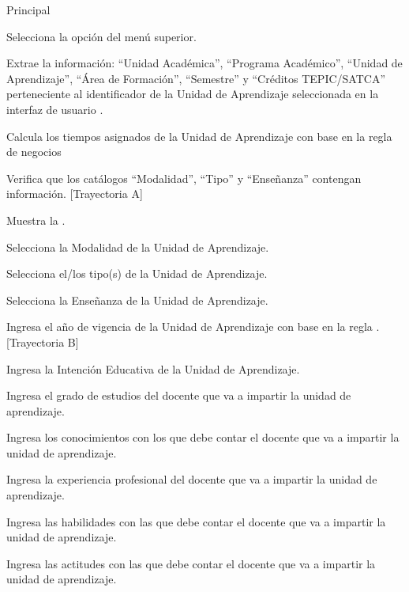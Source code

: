 \begin{UCtrayectoria}{Principal}

	\UCpaso[\UCactor] Selecciona la opción  del menú superior.
	
	\UCpaso Extrae la información: ``Unidad Académica'', ``Programa Académico'', ``Unidad de Aprendizaje'', ``Área de Formación'', ``Semestre'' y ``Créditos TEPIC/SATCA'' perteneciente al identificador de la Unidad de Aprendizaje seleccionada en la interfaz de usuario .
	
	\UCpaso Calcula los tiempos asignados de la Unidad de Aprendizaje con base en la regla de negocios 
	
	\UCpaso Verifica que los catálogos ``Modalidad'', ``Tipo'' y ``Enseñanza'' contengan información. [Trayectoria A]
	
	\UCpaso Muestra la . 
	
	\UCpaso[\UCactor] Selecciona la Modalidad de la Unidad de Aprendizaje. %
	
	\UCpaso[\UCactor] Selecciona el/los tipo(s) de la Unidad de Aprendizaje. %
	
	\UCpaso[\UCactor] Selecciona la Enseñanza de la Unidad de Aprendizaje. %
	
	\UCpaso[\UCactor] Ingresa el año de vigencia de la Unidad de Aprendizaje con base en la regla . [Trayectoria B]
	
	\UCpaso[\UCactor] Ingresa la Intención Educativa de la Unidad de Aprendizaje.
	
	\UCpaso[\UCactor] Ingresa el grado de estudios del docente que va a impartir la unidad de aprendizaje.
	
	\UCpaso[\UCactor] Ingresa los conocimientos con los que debe contar el docente que va a impartir la unidad de aprendizaje.
	
	\UCpaso[\UCactor] Ingresa la experiencia profesional del docente que va a impartir la unidad de aprendizaje.
	
	\UCpaso[\UCactor] Ingresa las habilidades con las que debe contar el docente que va a impartir la unidad de aprendizaje.
	
	\UCpaso[\UCactor] Ingresa las actitudes con las que debe contar el docente que va a impartir la unidad de aprendizaje.
	

\end{UCtrayectoria}
